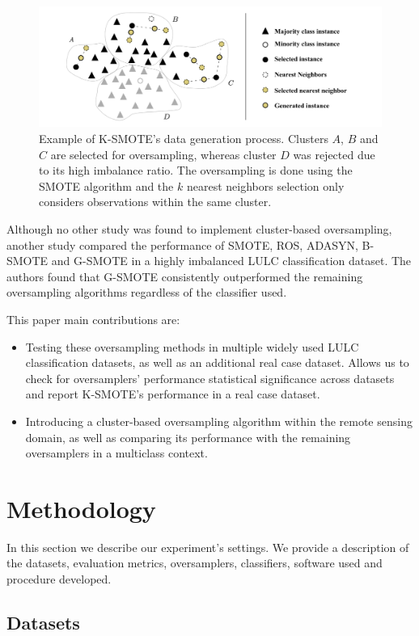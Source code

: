 \documentclass[parskip=full]{scrartcl}
\begin{document}
\begin{figure}[H]
	\centering
	\includegraphics[width=1\linewidth]{../analysis/kmeans_smote_example}
	\caption{Example of K-SMOTE's data generation process. Clusters $A$,
		$B$ and $C$ are selected for
		oversampling, whereas cluster $D$ was rejected due to its
		high imbalance ratio. The oversampling is done using the SMOTE algorithm and
		the $k$ nearest neighbors selection only considers
		observations within the same cluster.}
	\label{fig:kmeans_smote_example}
\end{figure}

Although no other study was found to implement cluster-based oversampling,
another study \cite{Douzas2019rs} compared the performance of SMOTE, ROS,
ADASYN, B-SMOTE and G-SMOTE in a highly imbalanced LULC classification dataset.
The authors found that G-SMOTE consistently outperformed the remaining
oversampling algorithms regardless of the classifier used.

This paper main contributions are:
\begin{itemize}
	\item Testing these oversampling methods in multiple widely used LULC classification
	      datasets, as well as an additional real case dataset. Allows us to check for
	      oversamplers' performance statistical significance across datasets and report
	      K-SMOTE's performance in a real case dataset.
	\item Introducing a cluster-based oversampling algorithm within the remote sensing
	      domain, as well as comparing its performance with the remaining oversamplers in
	      a multiclass context.

\end{itemize}

\section{Methodology}

In this section we describe our experiment's settings. We provide a description
of the datasets, evaluation metrics, oversamplers, classifiers, software used
and procedure developed.

\subsection{Datasets}



\end{document}
